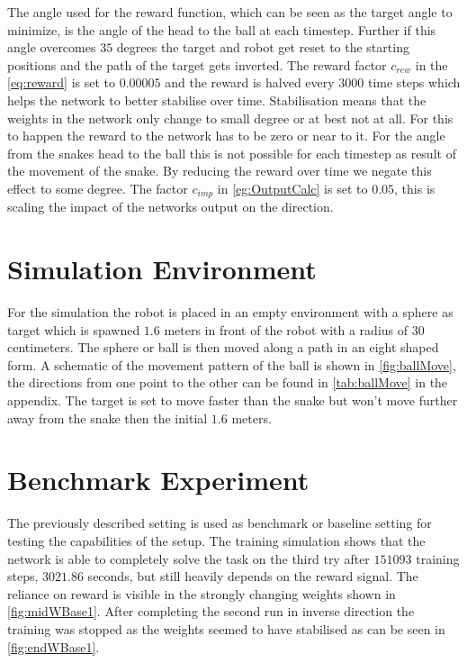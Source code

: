 The angle used for the reward function, which can be seen as the target angle to minimize, is the angle of the head to the ball at each timestep. Further if this angle overcomes $35$ degrees the target and robot get reset to the starting positions and the path of the target gets inverted.
The reward factor $c_{rew}$ in the \autoref{eq:reward} is set to $0.00005$ and the reward is halved every $3000$ time steps which helps the network to better stabilise over time. Stabilisation means that the weights in the network only change to small degree or at best not at all. For this to happen the reward to the network has to be zero or near to it. For the angle from the snakes head to the ball this is not possible for each timestep as result of the movement of the snake. By reducing the reward over time we negate this effect to some degree. The factor $c_{imp}$ in \autoref{eg:OutputCalc} is set to $0.05$, this is scaling the impact of the networks output on the direction. 

\section{Simulation Environment}
For the simulation the robot is placed in an empty environment with a sphere as target which is spawned $1.6$ meters in front of the robot with a radius of $30$ centimeters. The sphere or ball is then moved along a path in an eight shaped form. A schematic of the movement pattern of the ball is shown in \autoref{fig:ballMove}, the directions from one point to the other can be found in \autoref{tab:ballMove} in the appendix.
The target is set to move faster than the snake but won’t move further away from the snake then the initial $1.6$ meters.


\section{Benchmark Experiment}
The previously described setting is used as benchmark or baseline setting for testing the capabilities of the setup. 
The training simulation shows that the network is able to completely solve the task on the third try after $151093$ training steps, $3021.86$ seconds, but still heavily depends on the reward signal. The reliance on reward is visible in the strongly changing weights shown in \autoref{fig:midWBase1}. After completing the second run in inverse direction the training was stopped as the weights seemed to have stabilised as can be seen in \autoref{fig:endWBase1}.

